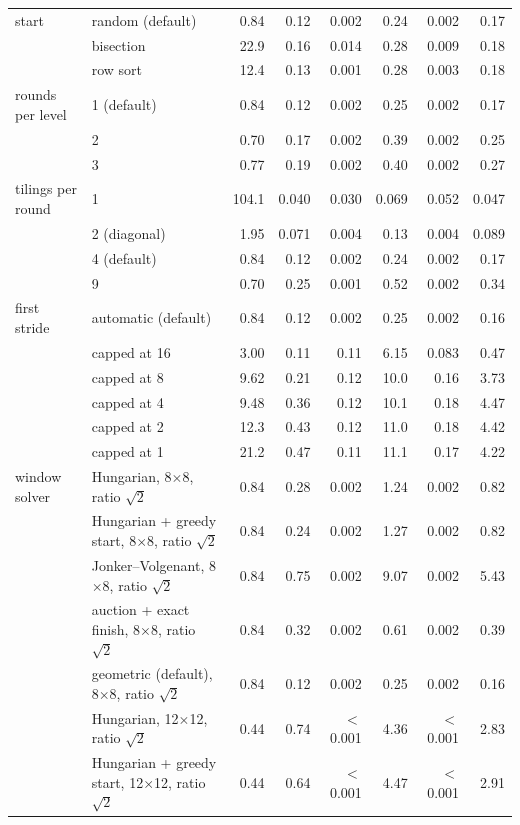 \begin{tabular}{llrrrrrr}
\addlinespace
start & random (default) & 0.84 & 0.12 & 0.002 & 0.24 & 0.002 & 0.17 \\
 & bisection & 22.9 & 0.16 & 0.014 & 0.28 & 0.009 & 0.18 \\
 & row sort & 12.4 & 0.13 & 0.001 & 0.28 & 0.003 & 0.18 \\
\addlinespace
rounds per level & 1 (default) & 0.84 & 0.12 & 0.002 & 0.25 & 0.002 & 0.17 \\
 & 2 & 0.70 & 0.17 & 0.002 & 0.39 & 0.002 & 0.25 \\
 & 3 & 0.77 & 0.19 & 0.002 & 0.40 & 0.002 & 0.27 \\
\addlinespace
tilings per round & 1 & 104.1 & 0.040 & 0.030 & 0.069 & 0.052 & 0.047 \\
 & 2 (diagonal) & 1.95 & 0.071 & 0.004 & 0.13 & 0.004 & 0.089 \\
 & 4 (default) & 0.84 & 0.12 & 0.002 & 0.24 & 0.002 & 0.17 \\
 & 9 & 0.70 & 0.25 & 0.001 & 0.52 & 0.002 & 0.34 \\
\addlinespace
first stride & automatic (default) & 0.84 & 0.12 & 0.002 & 0.25 & 0.002 & 0.16 \\
 & capped at 16 & 3.00 & 0.11 & 0.11 & 6.15 & 0.083 & 0.47 \\
 & capped at 8 & 9.62 & 0.21 & 0.12 & 10.0 & 0.16 & 3.73 \\
 & capped at 4 & 9.48 & 0.36 & 0.12 & 10.1 & 0.18 & 4.47 \\
 & capped at 2 & 12.3 & 0.43 & 0.12 & 11.0 & 0.18 & 4.42 \\
 & capped at 1 & 21.2 & 0.47 & 0.11 & 11.1 & 0.17 & 4.22 \\
\addlinespace
window solver & Hungarian, 8$\times$8, ratio $\sqrt2$ & 0.84 & 0.28 & 0.002 & 1.24 & 0.002 & 0.82 \\
 & Hungarian + greedy start, 8$\times$8, ratio $\sqrt2$ & 0.84 & 0.24 & 0.002 & 1.27 & 0.002 & 0.82 \\
 & Jonker--Volgenant, 8$\times$8, ratio $\sqrt2$ & 0.84 & 0.75 & 0.002 & 9.07 & 0.002 & 5.43 \\
 & auction + exact finish, 8$\times$8, ratio $\sqrt2$ & 0.84 & 0.32 & 0.002 & 0.61 & 0.002 & 0.39 \\
 & geometric (default), 8$\times$8, ratio $\sqrt2$ & 0.84 & 0.12 & 0.002 & 0.25 & 0.002 & 0.16 \\
 & Hungarian, 12$\times$12, ratio $\sqrt2$ & 0.44 & 0.74 & $<$0.001 & 4.36 & $<$0.001 & 2.83 \\
 & Hungarian + greedy start, 12$\times$12, ratio $\sqrt2$ & 0.44 & 0.64 & $<$0.001 & 4.47 & $<$0.001 & 2.91 \\

\end{tabular}
